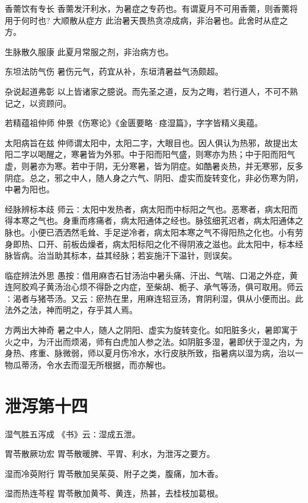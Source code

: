 \documentclass[a4paper,12pt,UTF8,twoside]{ctexbook}
\begin{document}
    香薷饮有专长
    香薷发汗利水，为暑症之专药也。有谓夏月不可用香薷，则香薷将用于何时也?
    大顺散从症方
    此治暑天畏热贪凉成病，非治暑也。此舍时从症之方。
    
    生脉散久服康
    此夏月常服之剂，非治病方也。
    
    东坦法防气伤
    暑伤元气，药宜从补，东垣清暑益气汤颇超。
    
    杂说起道弗彰
    以上皆诸家之臆说。而先圣之道，反为之晦，若行道人，不可不熟记之，以资顾问。
    
    若精蕴祖仲师
    仲景《伤寒论》《金匮要略·痉湿篇》，字字皆精义奥蕴。
    
    太阳病旨在兹
    仲师谓太阳中，太阳二字，大眼目也。因人俱认为热邪，故提出太阳二字以喝醒之，寒暑皆为外邪。中于阳而阳气盛，则寒亦为热；中于阳而阳气虚，则暑亦为寒。若中于阴，无分寒暑，皆为阴症。如酷暑炎热，并无寒邪，反多阴症。总之，邪之中人，随人身之六气、阴阳、虚实而旋转变化，非必伤寒为阴，中暑为阳也。
    
    经脉辨标本歧
    师云∶太阳中发热者，病太阳而中标阳之气也。恶寒者，病太阳而得本寒之气也。身重而疼痛者，病太阳通体之经也。脉弦细芤迟者，病太阳通体之脉也。小便已洒洒然毛耸、手足逆冷者，病太阳本寒之气不得阳热之化也。小有劳身即热、口开、前板齿燥者，病太阳标阳之化不得阴液之滋也。此太阳中，标本经脉皆病。治当助其标本，益其经脉；若妄施汗下温针，则误矣。
    
    临症辨法外思
    愚按∶借用麻杏石甘汤治中暑头痛、汗出、气喘、口渴之外症，黄连阿胶鸡子黄汤治心烦不得卧之内症，至柴胡、栀子、承气等汤，俱可取用。师云∶渴者与猪苓汤。又云∶瘀热在里，用麻连轺豆汤，育阴利湿，俱从小便而出。此法外之法，神而明之，存乎其人焉。
    
    方两出大神奇
    暑之中人，随人之阴阳、虚实为旋转变化。如阳脏多火，暑即寓于火之中，为汗出而烦渴，师有白虎加人参之法。如阴脏多湿，暑即伏于湿之内，为身热、疼重、脉微弱，师以夏月伤冷水，水行皮肤所致，指暑病以湿为病，治以一物瓜蒂汤，令水去而湿无所根据，而亦解也。
    
    \chapter{泄泻第十四}
      湿气胜五泻成
    《书》云∶湿成五泄。
    
    胃苓散厥功宏
    胃苓散暖脾、平胃、利水，为泄泻之要方。
    
    湿而冷萸附行
    胃苓散加吴茱萸、附子之类，腹痛，加木香。
    
    湿而热连芩程
    胃苓散加黄芩、黄连，热甚，去桂枝加葛根。
    
\end{document}
